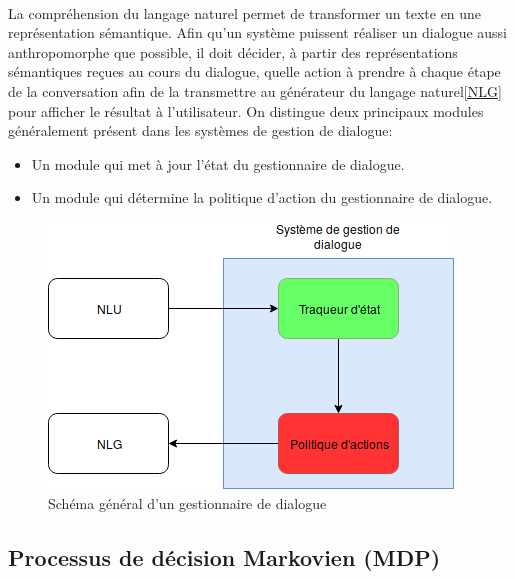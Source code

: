 	\paragraph{}
	La compréhension du langage naturel permet de transformer un texte en une représentation sémantique. Afin qu’un système puissent réaliser un dialogue aussi anthropomorphe que possible, il doit décider, à partir des représentations sémantiques reçues au cours du dialogue, quelle action à prendre à chaque étape de la conversation afin de la transmettre au générateur du langage naturel\ref{NLG} pour afficher le résultat à l’utilisateur. On distingue deux principaux modules généralement présent dans les systèmes de gestion de dialogue:
\begin{itemize}
	\item Un module qui met à jour l’état du gestionnaire de dialogue.
	\item Un module qui détermine la politique d’action du gestionnaire de dialogue.
\end{itemize}

\begin{figure}[H]
	\centering
	\includegraphics[width=.7\linewidth]{images/DM/DMGeneral.png} 
	\caption{Schéma général d'un gestionnaire de dialogue} 
\end{figure}


	\subsection{Processus de décision Markovien (MDP)}
